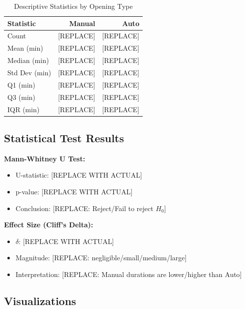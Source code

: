\documentclass[12pt,a4paper]{article}
\begin{document}
\begin{table}[H]
\centering
\caption{Descriptive Statistics by Opening Type}
\begin{tabular}{@{}lrr@{}}
\toprule
\textbf{Statistic} & \textbf{Manual} & \textbf{Auto} \\
\midrule
Count & [REPLACE] & [REPLACE] \\
Mean (min) & [REPLACE] & [REPLACE] \\
Median (min) & [REPLACE] & [REPLACE] \\
Std Dev (min) & [REPLACE] & [REPLACE] \\
Q1 (min) & [REPLACE] & [REPLACE] \\
Q3 (min) & [REPLACE] & [REPLACE] \\
IQR (min) & [REPLACE] & [REPLACE] \\
\bottomrule
\end{tabular}
\end{table}

\subsection{Statistical Test Results}

\textbf{Mann-Whitney U Test:}
\begin{itemize}
    \item U-statistic: [REPLACE WITH ACTUAL]
    \item p-value: [REPLACE WITH ACTUAL]
    \item Conclusion: [REPLACE: Reject/Fail to reject $H_0$]
\end{itemize}

\textbf{Effect Size (Cliff's Delta):}
\begin{itemize}
    \item $\delta$: [REPLACE WITH ACTUAL]
    \item Magnitude: [REPLACE: negligible/small/medium/large]
    \item Interpretation: [REPLACE: Manual durations are lower/higher than Auto]
\end{itemize}

\subsection{Visualizations}
\end{document}
